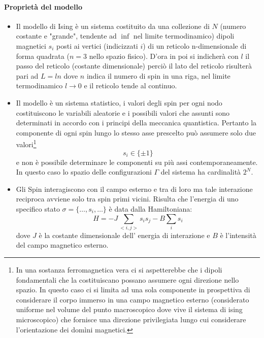 \paragraph{Proprietà del modello}

\begin{itemize}
\item Il modello di Ising è un sistema costituito da una collezione di $N$ (numero costante e "grande", tendente ad $\inf$ nel limite termodinamico) dipoli magnetici $s_{i}$ posti ai vertici (indicizzati $i$) di un reticolo n-dimensionale di forma quadrata ($n=3$ nello spazio fisico).
D'ora in poi si indicherà con $l$ il passo del reticolo (costante dimensionale) perciò il lato del reticolo risulterà pari ad $L = l n$ dove $n$ indica il numero di spin in una riga, nel limite termodinamico $l\rightarrow 0$ e il reticolo tende al continuo.

\item Il modello è un sistema statistico, i valori degli spin per ogni nodo costituiscono le variabili aleatorie e i possibili valori che assunti sono determinati in accordo con i principi della meccanica quantistica. Pertanto la componente di ogni spin lungo lo stesso asse prescelto può assumere solo due valori\footnote{ In una sostanza ferromagnetica vera ci si aspetterebbe che i dipoli fondamentali che la costituiscano possano assumere ogni direzione nello spazio. In questo caso ci si limita ad una sola componente in prospettiva di considerare il corpo immerso in una campo magnetico esterno (considerato uniforme nel volume del punto macroscopico dove vive il sistema di ising microscopico) che fornisce una direzione privilegiata lungo cui considerare l'orientazione dei domìni magnetici.} 
$$s_{i}\in \lbrace \pm 1 \rbrace$$
e non è possibile determinare le componenti su più assi contemporaneamente.
In questo caso lo spazio delle configurazioni $\Gamma$ del sistema ha cardinalità $2^{N}$.

\item Gli Spin interagiscono con il campo esterno e tra di loro ma tale interazione reciproca avviene solo tra spin primi vicini. Risulta che l'energia di uno specifico stato $\sigma =\lbrace\ldots , s_{i} ,\ldots \rbrace$ è data dalla Hamiltoniana:
\begin{equation}\label{Hamiltoniana}
H = - J \sum_{<i,j>}s_{i}s_{j}  -B\sum_i s_i
\end{equation}
dove $J$ è la costante dimensionale dell' energia di interazione e $B$ è l'intensità del campo magnetico esterno.


\end{itemize}
